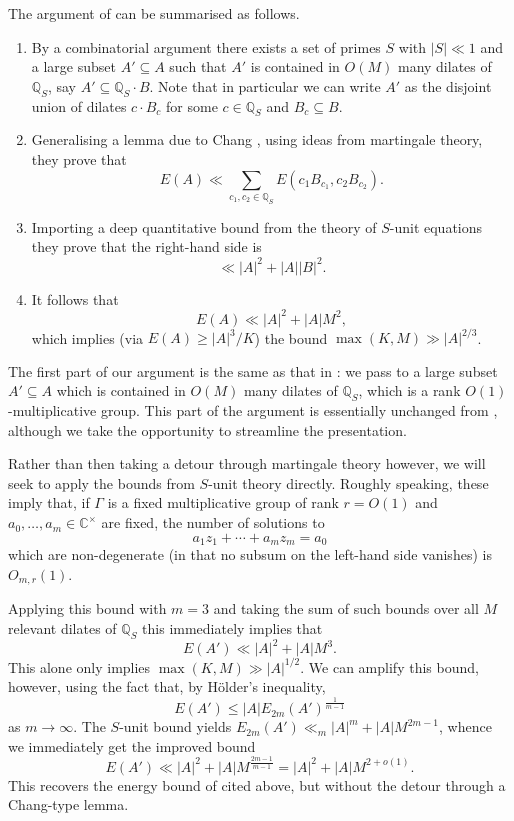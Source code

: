 \documentclass{amsart}
\renewcommand{\leq}{\leqslant}
\renewcommand{\geq}{\geqslant}
\newcommand{\bbq}{\mathbb{Q}}
\newcommand{\bbc}{\mathbb{C}}
\newcommand{\abs}[1]{\left\lvert #1\right\rvert}
\theoremstyle{definition}
\begin{document}
The argument of \cite{HRSZ25} can be summarised as follows.
\begin{enumerate}
\item By a combinatorial argument there exists a set of primes $S$ with $\abs{S}\ll 1$ and a large subset $A'\subseteq A$ such that $A'$ is contained in $O(M)$ many dilates of $\bbq_S$, say $A'\subseteq \bbq_S\cdot B$. Note that in particular we can write $A'$ as the disjoint union of dilates $c\cdot B_c$ for some $c\in \bbq_S$ and $B_c\subseteq B$.
\item Generalising a lemma due to Chang \cite{Ch03}, using ideas from martingale theory, they prove that
\[E(A) \ll \sum_{c_1,c_2\in \bbq_S}E(c_1B_{c_1},c_2B_{c_2}).\]
\item Importing a deep quantitative bound from the theory of $S$-unit equations they prove that the right-hand side is
\[\ll \abs{A}^2+\abs{A}\abs{B}^2.\]
\item It follows that
\[E(A) \ll \abs{A}^2+\abs{A}M^2,\]
which implies (via $E(A) \geq \abs{A}^3/K$) the bound $\max(K,M)\gg \abs{A}^{2/3}$.
\end{enumerate}

The first part of our argument is the same as that in \cite{HRSZ25}: we pass to a large subset $A'\subseteq A$ which is contained in $O(M)$ many dilates of $\bbq_S$, which is a rank $O(1)$-multiplicative group. This part of the argument is essentially unchanged from \cite{HRSZ25}, although we take the opportunity to streamline the presentation.

Rather than then taking a detour through martingale theory however, we will seek to apply the bounds from $S$-unit theory directly. Roughly speaking, these imply that, if $\Gamma$ is a fixed multiplicative group of rank $r=O(1)$ and $a_0,\ldots,a_m\in \bbc^\times$ are fixed, the number of solutions to
\[a_1z_1+\cdots+a_mz_m=a_0\]
which are non-degenerate (in that no subsum on the left-hand side vanishes) is $O_{m,r}(1)$. 

Applying this bound with $m=3$ and taking the sum of such bounds over all $M$ relevant dilates of $\bbq_S$ this immediately implies that
\[E(A') \ll \abs{A}^2+\abs{A}M^3.\]
This alone only implies $\max(K,M) \gg \abs{A}^{1/2}$. We can amplify this bound, however, using the fact that, by H\"{o}lder's inequality,
\[E(A') \leq \abs{A}E_{2m}(A')^{\frac{1}{m-1}}\]
as $m\to \infty$. The $S$-unit bound yields $E_{2m}(A')\ll_m \abs{A}^m+\abs{A}M^{2m-1}$, whence we immediately get the improved bound
\[E(A') \ll \abs{A}^2+\abs{A}M^{\frac{2m-1}{m-1}}=\abs{A}^2+\abs{A}M^{2+o(1)}.\]
This recovers the energy bound of \cite{HRSZ25} cited above, but without the detour through a Chang-type lemma.
\end{document}
